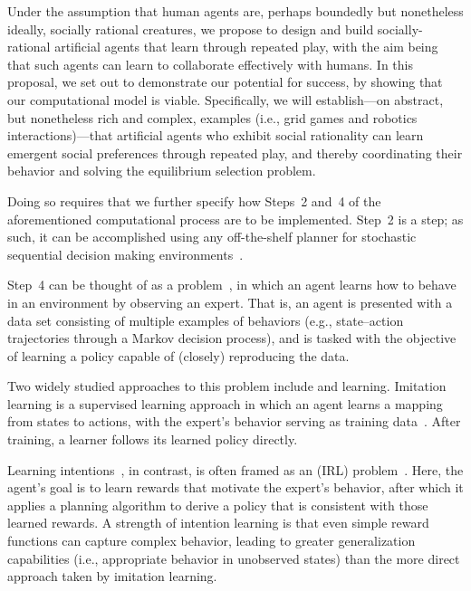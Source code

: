 
Under the assumption that human agents are, perhaps boundedly but
nonetheless ideally, socially rational creatures, we propose to design
and build socially-rational artificial agents that learn through
repeated play, with the aim being that such agents can learn to
collaborate effectively with humans.
%
In this proposal, we set out to demonstrate our potential for success,
by showing that our computational model is viable.  Specifically, we
will establish---on abstract, but nonetheless rich and complex,
examples (i.e., grid games and robotics interactions)---that artificial agents who exhibit
social rationality can learn emergent social preferences through
repeated play, and thereby coordinating their behavior and solving
the equilibrium selection problem.

Doing so requires that we further specify how Steps~2 and~4 of the
aforementioned computational process are to be implemented.  Step~2 is
a  step; as such, it can be accomplished using any
off-the-shelf planner for stochastic sequential decision making
environments~\cite{Barto95,bellman57,boutilier99,collins95,kearns99b,kocsis06}.

Step~4 can be thought of as a 
problem~\cite{argall09}, in which an agent learns how to behave in an
environment by observing an expert.  That is, an agent is presented
with a data set consisting of multiple examples of behaviors (e.g.,
state--action trajectories through a Markov decision process), and is
tasked with the objective of learning a policy capable of (closely)
reproducing the data.

Two widely studied approaches to this problem include
 and  learning.  Imitation learning
is a supervised learning approach in which an agent learns a mapping
from states to actions, with the expert's behavior serving as training
data~\cite{pomerleau93}.  After training, a learner follows its
learned policy directly.

Learning intentions~\cite{macglashan15b}, in contrast, is often framed
as an  (IRL)
problem~\cite{ng00,babes11}.  Here, the agent's goal is to learn
rewards that motivate the expert's behavior, after which it applies a
planning algorithm to derive a policy that is consistent with those
learned rewards.  A strength of intention learning is that even simple
reward functions can capture complex behavior, leading to greater
generalization capabilities (i.e., appropriate behavior in unobserved
states) than the more direct approach taken by imitation learning.

